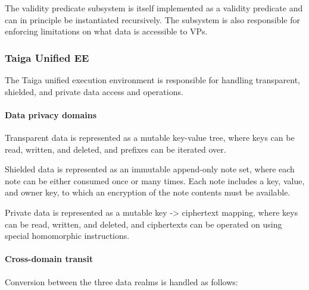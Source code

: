 The validity predicate subsystem is itself implemented as a validity
predicate and can in principle be instantiated recursively. The
subsystem is also responsible for enforcing limitations on what data is
accessible to VPs.

\subsubsection{Taiga Unified EE}\label{taiga-unified-ee}

The Taiga unified execution environment is responsible for handling
transparent, shielded, and private data access and operations.

\paragraph{Data privacy domains}\label{data-privacy-domains}

Transparent data is represented as a mutable key-value tree, where keys
can be read, written, and deleted, and prefixes can be iterated over.

Shielded data is represented as an immutable append-only note set, where
each note can be either consumed once or many times. Each note includes
a key, value, and owner key, to which an encryption of the note contents
must be available.

Private data is represented as a mutable key -\textgreater{} ciphertext
mapping, where keys can be read, written, and deleted, and ciphertexts
can be operated on using special homomorphic instructions.

\paragraph{Cross-domain transit}\label{cross-domain-transit}

Conversion between the three data realms is handled as follows:

